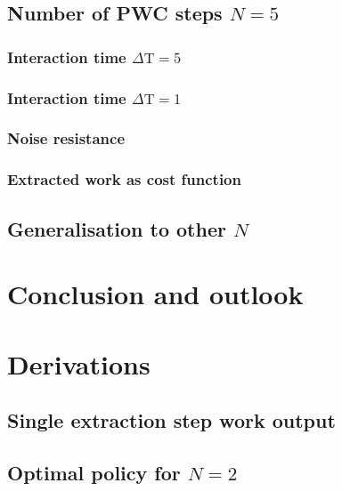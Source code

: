 \section{Number of PWC steps $N=5$}\label{n5}
\subsection{Interaction time $\Delta \mathrm{T} = 5$}\label{n_5_ml}


\subsection{Interaction time $\Delta \mathrm{T} = 1$}\label{n_5_dt1}


\subsection{Noise resistance}\label{ml_noise}


\subsection{Extracted work as cost function}\label{work_cost}


\section{Generalisation to other $N$}
 

\chapter{Conclusion and outlook}\label{outlook}





\appendix
\chapter{Derivations}
\section{Single extraction step work output}
 \label{deriv_jump}

\section{Optimal policy for $N=2$} \label{n2_opt_pol}

